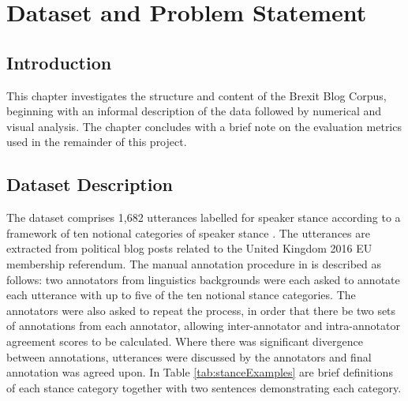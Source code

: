 \documentclass[Dissertation.tex]{subfiles}
\begin{document}
\chapter{Dataset and Problem Statement}
\section{Introduction}
This chapter investigates the structure and content of the Brexit Blog Corpus, beginning with an informal description of the data followed by numerical and visual analysis. The chapter concludes with a brief note on the evaluation metrics used in the remainder of this project. 
\section{Dataset Description} \label{Data}

The dataset comprises 1,682 utterances  labelled for speaker stance according to a framework of ten notional categories of speaker stance \cite{simakiAnnotatingSpeakerStance2017}. The utterances are extracted from political blog posts related to the United Kingdom 2016 EU membership referendum. The manual annotation procedure in \cite{simakiAnnotatingSpeakerStance2017} is described as follows: two annotators from linguistics backgrounds were each asked to annotate each utterance with up to five of the ten notional stance categories. The annotators were also asked to repeat the process, in order that there be two sets of annotations from each annotator, allowing inter-annotator and intra-annotator agreement scores to be calculated. Where there was significant divergence between annotations, utterances were discussed by the annotators and final annotation was agreed upon. In Table \ref{tab:stanceExamples} are brief definitions of each stance category together with two sentences demonstrating each category.
\end{document}
